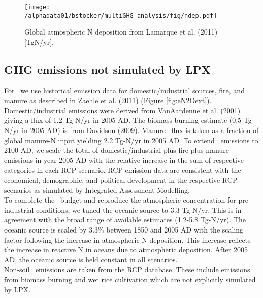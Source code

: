 \documentclass{myreport}
\begin{document}
\begin{figure}[ht!]
\begin{center}
\texttt{[image: /alphadata01/bstocker/multiGHG\_analysis/fig/ndep.pdf]}
\end{center}
\caption{Global atmospheric N deposition from Lamarque et al. (2011)\cite{lamarque11cc} [TgN/yr].}
\label{fig:nfert_global}
\end{figure}


\clearpage

\subsection{GHG emissions not simulated by LPX}
\label{sec:eghgext}

For \nno\ we use historical emission data for domestic/industrial sources, fire, and manure as described in Zaehle et al. (2011)\cite{zaehle11ngeo} (Figure \ref{fig:eN2Oext}). Domestic/industrial emissions were derived from VanAardenne et al. (2001)\cite{vanaardenne01gbc} giving a flux of 1.2 Tg\nno -N/yr in 2005 AD. The biomass burning estimate (0.5 Tg\nno -N/yr in 2005 AD) is from Davidson (2009)\cite{davidson09natgeo}. Manure-\nno\ flux is taken as a fraction of global manure-N input yielding 2.2 Tg\nno -N/yr in 2005 AD. To extend \nno\ emissions to 2100 AD, we scale the total of domestic/industrial plus fire plus manure emissions in year 2005 AD with the relative increase in the sum of respective categories in each RCP scenario. RCP emission data are consistent with the economical, demographic, and political development in the respective RCP scenarios as simulated by Integrated Assessment Modelling.\\ 

To complete the \nno\ budget and reproduce the atmospheric concentration for pre-industrial conditions, we tuned the oceanic source to 3.3 Tg\nno -N/yr. This is in agreement with the broad range of available estimates (1.2-5.8 Tg\nno -N/yr)\cite{hirsch06gbc, denman07ipcc, rhee09jgr}. The oceanic source is scaled by 3.3$\%$ between 1850 and 2005 AD with the scaling factor following the increase in atmospheric N deposition. This increase reflects the increase in reactive N in oceans due to atmospheric deposition\cite{sunth12grl}. After 2005 AD, the oceanic source is held constant in all scenarios.\\

Non-soil \chh\ emissions are taken from the RCP database\cite{RCPdatabase}. These include emissions from biomass burning and wet rice cultivation which are not explicitly simulated by LPX.\\ %
\end{document}
